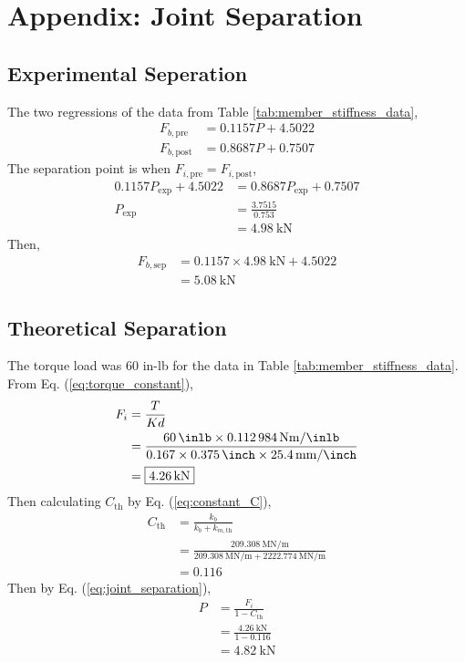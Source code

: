 \section{Appendix: Joint Separation}
\label{sec:joint_seperation}

\subsection{Experimental Seperation}
The two regressions of the data from Table \ref{tab:member_stiffness_data}, 
\begin{align*}
    F_{b, \text{pre}} &= 0.1157 P + 4.5022 \\
    F_{b, \text{post}} &= 0.8687 P + 0.7507
\end{align*}
The separation point is when $F_{i, \text{pre}} = F_{i, \text{post}}$, 
\begin{align*}
    0.1157 P_{\text{exp}} + 4.5022 &= 0.8687 P_{\text{exp}} + 0.7507 \\
    P_{\text{exp}} &= \frac{3.7515}{0.753} \\
    &= \boxed{\qty{4.98}{\kilo\newton}} 
\end{align*}
Then,
\begin{align*}
    F_{b, \text{sep}} &= 0.1157 \times \qty{4.98}{\kilo\newton} + 4.5022 \\
    &= \boxed{\qty{5.08}{\kilo\newton}}
\end{align*}

\subsection{Theoretical Separation}
The torque load was 60 in-lb for the data in Table \ref{tab:member_stiffness_data}. From Eq. (\ref{eq:torque_constant}), 
\begin{align*}
    F_i &= \frac{T}{Kd} \\
    &= \frac{\qty{60}{\inlb} \times \qty{0.112984}{\newton\meter\per\inlb}}{0.167 \times \qty{0.375}{\inch} \times \qty{25.4}{\milli\meter\per\inch}} \\
    &= \boxed{\qty{4.26}{\kilo\newton}}
\end{align*}
Then calculating $C_{\text{th}}$ by Eq. (\ref{eq:constant_C}),
\begin{align*}
    C_{\text{th}} &= \frac{k_b}{k_b + k_{m, \text{th}}} \\
    &= \frac{\qty{209.308}{\mega\newton\per\meter}}{\qty{209.308}{\mega\newton\per\meter} + \qty{2222.774}{\mega\newton\per\meter}} \\
    &= 0.116
\end{align*}
Then by Eq. (\ref{eq:joint_separation}),
\begin{align*}
    P &= \frac{F_i}{1-C_{\text{th}}} \\
    &= \frac{\qty{4.26}{\kilo\newton}}{1-0.116} \\
    &= \boxed{\qty{4.82}{\kilo\newton}}
\end{align*}

